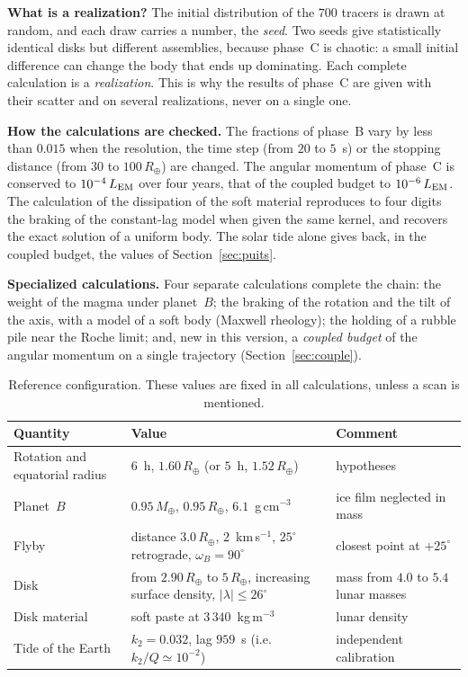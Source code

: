 \documentclass[11pt,a4paper]{article}
\newcommand{\Rt}{\ensuremath{R_\oplus}}
\newcommand{\Mt}{\ensuremath{M_\oplus}}
\newcommand{\LEM}{\ensuremath{L_{\rm EM}}}
\begin{document}
\textbf{What is a realization?} The initial distribution of the $700$ tracers is drawn at random, and each draw carries a number, the \emph{seed}. Two seeds give statistically identical disks but different assemblies, because phase~C is chaotic: a small initial difference can change the body that ends up dominating. Each complete calculation is a \emph{realization}. This is why the results of phase~C are given with their scatter and on several realizations, never on a single one.

\textbf{How the calculations are checked.} The fractions of phase~B vary by less than $0.015$ when the resolution, the time step (from $20$ to $5$~s) or the stopping distance (from $30$ to $100\,\Rt$) are changed. The angular momentum of phase~C is conserved to $10^{-4}\,\LEM$ over four years, that of the coupled budget to $10^{-6}\,\LEM$. The calculation of the dissipation of the soft material reproduces to four digits the braking of the constant-lag model when given the same kernel, and recovers the exact solution of a uniform body. The solar tide alone gives back, in the coupled budget, the values of Section~\ref{sec:puits}.

\textbf{Specialized calculations.} Four separate calculations complete the chain: the weight of the magma under planet~$B$; the braking of the rotation and the tilt of the axis, with a model of a soft body (Maxwell rheology); the holding of a rubble pile near the Roche limit; and, new in this version, a \emph{coupled budget} of the angular momentum on a single trajectory (Section~\ref{sec:couple}).

\begin{table}[htbp]
\centering
\caption{Reference configuration. These values are fixed in all calculations, unless a scan is mentioned.\label{tab:config}}
\small
\begin{tabular}{>{\raggedright\arraybackslash}p{4.4cm}>{\raggedright\arraybackslash}p{5.6cm}>{\raggedright\arraybackslash}p{4.6cm}}
\toprule
Quantity & Value & Comment \\
\midrule
Rotation and equatorial radius & $6$~h, $1.60\,\Rt$ (or $5$~h, $1.52\,\Rt$) & hypotheses \\
Planet~$B$ & $0.95\,\Mt$, $0.95\,\Rt$, $6.1$~g\,cm$^{-3}$ & ice film neglected in mass \\
Flyby & distance $3.0\,\Rt$, $2$~km\,s$^{-1}$, $25^\circ$ retrograde, $\omega_B=90^\circ$ & closest point at $+25^\circ$ \\
Disk & from $2.90\,\Rt$ to $5\,\Rt$, increasing surface density, $|\lambda|\le26^\circ$ & mass from $4.0$ to $5.4$ lunar masses \\
Disk material & soft paste at $3\,340$~kg\,m$^{-3}$ & lunar density \\
Tide of the Earth & $k_2=0.032$, lag $959$~s (i.e.\ $k_2/Q\simeq10^{-2}$) & independent calibration \\
\bottomrule
\end{tabular}
\end{table}
\end{document}
